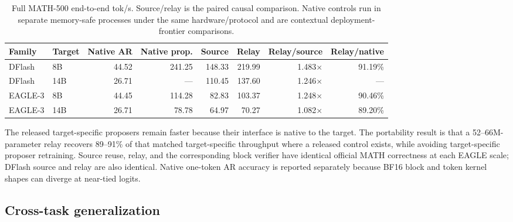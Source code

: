 \documentclass[10pt]{article}
\begin{document}
\begin{table}[H]
\centering
\scriptsize
\begin{tabular}{@{}llrrrrrr@{}}
\toprule
Family & Target & Native AR & Native prop. & Source & Relay & Relay/source & Relay/native \\
\midrule
DFlash & 8B & 44.52 & 241.25 & 148.33 & 219.99 & 1.483$\times$ & 91.19\% \\
DFlash & 14B & 26.71 & --- & 110.45 & 137.60 & 1.246$\times$ & --- \\
EAGLE-3 & 8B & 44.45 & 114.28 & 82.83 & 103.37 & 1.248$\times$ & 90.46\% \\
EAGLE-3 & 14B & 26.71 & 78.78 & 64.97 & 70.27 & 1.082$\times$ & 89.20\% \\
\bottomrule
\end{tabular}
\caption{Full MATH-500 end-to-end tok/s. Source/relay is the paired causal
comparison. Native controls run in separate memory-safe processes under the
same hardware/protocol and are contextual deployment-frontier comparisons.}
\end{table}

The released target-specific proposers remain faster because their interface
is native to the target. The portability result is that a 52--66M-parameter
relay recovers 89--91\% of that matched target-specific throughput where a
released control exists, while avoiding target-specific proposer retraining.
Source reuse, relay, and the corresponding block verifier have identical
official MATH correctness at each EAGLE scale; DFlash source and relay are
also identical. Native one-token AR accuracy is reported separately because
BF16 block and token kernel shapes can diverge at near-tied logits.

\subsection{Cross-task generalization}
\end{document}
